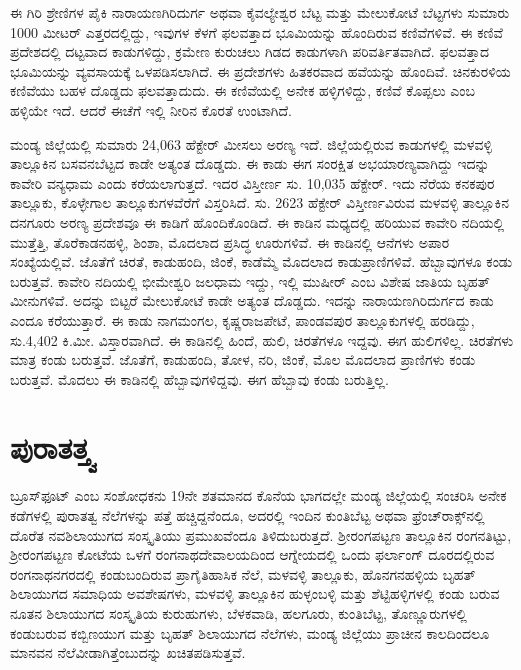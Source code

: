 ಈ ಗಿರಿ ಶ್ರೇಣಿಗಳ ಪೈಕಿ ನಾರಾಯಣಗಿರಿದುರ್ಗ ಅಥವಾ ಕೈವಲ್ಯೇಶ್ವರ ಬೆಟ್ಟ ಮತ್ತು ಮೇಲುಕೋಟೆ ಬೆಟ್ಟಗಳು ಸುಮಾರು 1000 ಮೀಟರ್​ ಎತ್ತರದಲ್ಲಿದ್ದು, ಇವುಗಳ ಕೆಳಗೆ ಫಲವತ್ತಾದ ಭೂಮಿಯನ್ನು ಹೊಂದಿರುವ ಕಣಿವೆಗಳಿವೆ. ಈ ಕಣಿವೆ ಪ್ರದೇಶದಲ್ಲಿ ದಟ್ಟವಾದ ಕಾಡುಗಳಿದ್ದು, ಕ್ರಮೇಣ ಕುರುಚಲು ಗಿಡದ ಕಾಡುಗಳಾಗಿ ಪರಿವರ್ತಿತವಾಗಿದೆ. ಫಲವತ್ತಾದ ಭೂಮಿಯನ್ನು ವ್ಯವಸಾಯಕ್ಕೆ ಒಳಪಡಿಸಲಾಗಿದೆ. ಈ ಪ್ರದೇಶಗಳು ಹಿತಕರವಾದ ಹವೆಯನ್ನು ಹೊಂದಿವೆ. ಚಿನಕುರಳಿಯ ಕಣಿವೆಯು ಬಹಳ ದೊಡ್ಡದು ಫಲವತ್ತಾದುದು. ಈ ಕಣಿವೆಯಲ್ಲಿ ಅನೇಕ ಹಳ್ಳಿಗಳಿದ್ದು, ಕಣಿವೆ ಕೊಪ್ಪಲು ಎಂಬ ಹಳ್ಳಿಯೇ ಇದೆ. ಆದರೆ ಈಚೆಗೆ ಇಲ್ಲಿ ನೀರಿನ ಕೊರತೆ ಉಂಟಾಗಿದೆ.

\newpage

ಮಂಡ್ಯ ಜಿಲ್ಲೆಯಲ್ಲಿ ಸುಮಾರು 24,063 ಹೆಕ್ಟೇರ್​ ಮೀಸಲು ಅರಣ್ಯ ಇದೆ. ಜಿಲ್ಲೆಯಲ್ಲಿರುವ ಕಾಡುಗಳಲ್ಲಿ ಮಳವಳ್ಳಿ ತಾಲ್ಲೂಕಿನ ಬಸವನಬೆಟ್ಟದ ಕಾಡೇ ಅತ್ಯಂತ ದೊಡ್ಡದು. ಈ ಕಾಡು ಈಗ ಸಂರಕ್ಷಿತ ಅಭಯಾರಣ್ಯವಾಗಿದ್ದು ಇದನ್ನು ಕಾವೇರಿ ವನ್ಯಧಾಮ ಎಂದು ಕರೆಯಲಾಗುತ್ತದೆ. ಇದರ ವಿಸ್ತೀರ್ಣ ಸು. 10,035 ಹೆಕ್ಟೇರ್​. ಇದು ನೆರೆಯ ಕನಕಪುರ ತಾಲ್ಲೂಕು, ಕೊಳ್ಳೇಗಾಲ ತಾಲ್ಲೂಕುಗಳವೆರೆಗೆ ವಿಸ್ತರಿಸಿದೆ. ಸು. 2623 ಹೆಕ್ಟೇರ್​ ವಿಸ್ತೀರ್ಣವಿರುವ ಮಳವಳ್ಳಿ ತಾಲ್ಲೂಕಿನ ದನಗೂರು ಅರಣ್ಯ ಪ್ರದೇಶವೂ ಈ ಕಾಡಿಗೆ ಹೊಂದಿಕೊಂಡಿದೆ. ಈ ಕಾಡಿನ ಮಧ್ಯದಲ್ಲಿ ಹರಿಯುವ ಕಾವೇರಿ ನದಿಯಲ್ಲಿ ಮುತ್ತೆತ್ತಿ, ತೊರೆಕಾಡನಹಳ್ಳಿ, ಶಿಂಶಾ, ಮೊದಲಾದ ಪ್ರಸಿದ್ಧ ಊರುಗಳಿವೆ. ಈ ಕಾಡಿನಲ್ಲಿ ಆನೆಗಳು ಅಪಾರ ಸಂಖ್ಯೆಯಲ್ಲಿವೆ. ಜೊತೆಗೆ ಚಿರತೆ, ಕಾಡುಹಂದಿ, ಜಿಂಕೆ, ಕಾಡೆಮ್ಮೆ ಮೊದಲಾದ ಕಾಡುಪ್ರಾಣಿಗಳಿವೆ. ಹೆಬ್ಬಾವುಗಳೂ ಕಂಡು ಬರುತ್ತವೆ. ಕಾವೇರಿ ನದಿಯಲ್ಲಿ ಭೀಮೇಶ್ವರಿ ಜಲಧಾಮ ಇದ್ದು, ಇಲ್ಲಿ ಮುಷೀರ್​ ಎಂಬ ವಿಶೇಷ ಜಾತಿಯ ಬೃಹತ್​ ಮೀನುಗಳಿವೆ. ಅದನ್ನು ಬಿಟ್ಟರೆ ಮೇಲುಕೋಟೆ ಕಾಡೇ ಅತ್ಯಂತ ದೊಡ್ಡದು. ಇದನ್ನು ನಾರಾಯಣಗಿರಿದುರ್ಗದ ಕಾಡು ಎಂದೂ ಕರೆಯುತ್ತಾರೆ. ಈ ಕಾಡು ನಾಗಮಂಗಲ, ಕೃಷ್ಣರಾಜಪೇಟೆ, ಪಾಂಡವಪುರ ತಾಲ್ಲೂಕುಗಳಲ್ಲಿ ಹರಡಿದ್ದು, ಸು.4,402 ಕಿ.ಮೀ. ವಿಸ್ತಾರವಾಗಿದೆ. ಈ ಕಾಡಿನಲ್ಲಿ ಹಿಂದೆ, ಹುಲಿ, ಚಿರತೆಗಳೂ ಇದ್ದವು. ಈಗ ಹುಲಿಗಳಿಲ್ಲ. ಚಿರತೆಗಳು ಮಾತ್ರ ಕಂಡು ಬರುತ್ತವೆ. ಜೊತೆಗೆ, ಕಾಡುಹಂದಿ, ತೋಳ, ನರಿ, ಜಿಂಕೆ, ಮೊಲ ಮೊದಲಾದ ಪ್ರಾಣಿಗಳು ಕಂಡು ಬರುತ್ತವೆ. ಮೊದಲು ಈ ಕಾಡಿನಲ್ಲಿ ಹೆಬ್ಬಾವುಗಳಿದ್ದವು. ಈಗ ಹೆಬ್ಬಾವು ಕಂಡು ಬರುತ್ತಿಲ್ಲ.


\section{ಪುರಾತತ್ತ್ವ}

ಬ್ರೂಸ್​ಫೂಟ್​ ಎಂಬ ಸಂಶೋಧಕನು 19ನೇ ಶತಮಾನದ ಕೊನೆಯ ಭಾಗದಲ್ಲೇ ಮಂಡ್ಯ ಜಿಲ್ಲೆಯಲ್ಲಿ ಸಂಚರಿಸಿ ಅನೇಕ ಕಡೆಗಳಲ್ಲಿ ಪುರಾತತ್ವ ನೆಲೆಗಳನ್ನು ಪತ್ತೆ ಹಚ್ಚಿದ್ದನೆಂದೂ, ಅದರಲ್ಲಿ ಇಂದಿನ ಕುಂತಿಬೆಟ್ಟ ಅಥವಾ ಫ್ರೆಂಚ್​ರಾಕ್ಸ್​ನಲ್ಲಿ ದೊರೆತ ನವಶಿಲಾಯುಗದ ಸಂಸ್ಕೃತಿಯು ಪ್ರಮುಖವೆಂದೂ ತಿಳಿದುಬರುತ್ತದೆ. ಶ‍್ರೀರಂಗಪಟ್ಟಣ ತಾಲ್ಲೂಕಿನ ರಂಗನತಿಟ್ಟು, ಶ‍್ರೀರಂಗಪಟ್ಟಣ ಕೋಟೆಯ ಒಳಗೆ ರಂಗನಾಥದೇವಾಲಯದಿಂದ ಆಗ್ನೇಯದಲ್ಲಿ ಒಂದು ಫರ್ಲಾಂಗ್​ ದೂರದಲ್ಲಿರುವ ರಂಗನಾಥನಗರದಲ್ಲಿ ಕಂಡುಬಂದಿರುವ ಪ್ರಾಗೈತಿಹಾಸಿಕ ನೆಲೆ, ಮಳವಳ್ಳಿ ತಾಲ್ಲೂಕು, ಹೊನಗನಹಳ್ಳಿಯ ಬೃಹತ್​ ಶಿಲಾಯುಗದ ಸಮಾಧಿಯ ಅವಶೇಷಗಳು, ಮಳವಳ್ಳಿ ತಾಲ್ಲೂಕಿನ ಹುಳ್ಳಂಬಳ್ಳಿ ಮತ್ತು ಶೆಟ್ಟಿಹಳ್ಳಿಗಳಲ್ಲಿ ಕಂಡು ಬರುವ ನೂತನ ಶಿಲಾಯುಗದ ಸಂಸ್ಕೃತಿಯ ಕುರುಹುಗಳು, ಬೆಳಕವಾಡಿ, ಹಲಗೂರು, ಕುಂತಿಬೆಟ್ಟ, ತೊಣ್ಣೂರುಗಳಲ್ಲಿ ಕಂಡುಬರುವ ಕಬ್ಬಿಣಯುಗ ಮತ್ತು ಬೃಹತ್​ ಶಿಲಾಯುಗದ ನೆಲೆಗಳು, ಮಂಡ್ಯ ಜಿಲ್ಲೆಯು ಪ್ರಾಚೀನ ಕಾಲದಿಂದಲೂ ಮಾನವನ ನೆಲೆವೀಡಾಗಿತ್ತೆಂಬುದನ್ನು ಖಚಿತಪಡಿಸುತ್ತವೆ.

